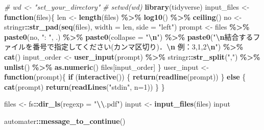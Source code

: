 \documentclass[
]{article}
\newenvironment{Shaded}{\begin{snugshade}}{\end{snugshade}}
\newcommand{\AttributeTok}[1]{\textcolor[rgb]{0.13,0.29,0.53}{#1}}
\newcommand{\CommentTok}[1]{\textcolor[rgb]{0.56,0.35,0.01}{\textit{#1}}}
\newcommand{\ControlFlowTok}[1]{\textcolor[rgb]{0.13,0.29,0.53}{\textbf{#1}}}
\newcommand{\DecValTok}[1]{\textcolor[rgb]{0.00,0.00,0.81}{#1}}
\newcommand{\FunctionTok}[1]{\textcolor[rgb]{0.13,0.29,0.53}{\textbf{#1}}}
\newcommand{\NormalTok}[1]{#1}
\newcommand{\OtherTok}[1]{\textcolor[rgb]{0.56,0.35,0.01}{#1}}
\newcommand{\SpecialCharTok}[1]{\textcolor[rgb]{0.81,0.36,0.00}{\textbf{#1}}}
\newcommand{\StringTok}[1]{\textcolor[rgb]{0.31,0.60,0.02}{#1}}
\begin{document}
\begin{Shaded}
\begin{Highlighting}[]
  \CommentTok{\# wd \textless{}{-} "set\_your\_directory"}
  \CommentTok{\# setwd(wd)}
\FunctionTok{library}\NormalTok{(tidyverse)}
\NormalTok{input\_files }\OtherTok{\textless{}{-}} \ControlFlowTok{function}\NormalTok{(files)\{}
\NormalTok{  len }\OtherTok{\textless{}{-}} \FunctionTok{length}\NormalTok{(files) }\SpecialCharTok{\%\textgreater{}\%} \FunctionTok{log10}\NormalTok{() }\SpecialCharTok{\%\textgreater{}\%} \FunctionTok{ceiling}\NormalTok{()}
\NormalTok{  no }\OtherTok{\textless{}{-}}\NormalTok{ stringr}\SpecialCharTok{::}\FunctionTok{str\_pad}\NormalTok{(}\FunctionTok{seq}\NormalTok{(files), }\AttributeTok{width =}\NormalTok{ len, }\AttributeTok{side =} \StringTok{"left"}\NormalTok{)}
\NormalTok{  prompt }\OtherTok{\textless{}{-}} 
\NormalTok{    files }\SpecialCharTok{\%\textgreater{}\%}
    \FunctionTok{paste0}\NormalTok{(no, }\StringTok{": "}\NormalTok{, .) }\SpecialCharTok{\%\textgreater{}\%}
    \FunctionTok{paste0}\NormalTok{(}\AttributeTok{collapse =} \StringTok{"}\SpecialCharTok{\textbackslash{}n}\StringTok{"}\NormalTok{) }\SpecialCharTok{\%\textgreater{}\%}
    \FunctionTok{paste0}\NormalTok{(}\StringTok{"}\SpecialCharTok{\textbackslash{}n}\StringTok{結合するファイルを番号で指定してください(カンマ区切り)．}\SpecialCharTok{\textbackslash{}n}\StringTok{  例：3,1,2}\SpecialCharTok{\textbackslash{}n}\StringTok{"}\NormalTok{) }\SpecialCharTok{\%\textgreater{}\%}
    \FunctionTok{cat}\NormalTok{()}
\NormalTok{  input\_order }\OtherTok{\textless{}{-}} 
    \FunctionTok{user\_input}\NormalTok{(prompt) }\SpecialCharTok{\%\textgreater{}\%}
\NormalTok{    stringr}\SpecialCharTok{::}\FunctionTok{str\_split}\NormalTok{(}\StringTok{","}\NormalTok{) }\SpecialCharTok{\%\textgreater{}\%}
    \FunctionTok{unlist}\NormalTok{() }\SpecialCharTok{\%\textgreater{}\%}
    \FunctionTok{as.numeric}\NormalTok{()}
\NormalTok{  files[input\_order]}
\NormalTok{\}}
\NormalTok{user\_input }\OtherTok{\textless{}{-}} \ControlFlowTok{function}\NormalTok{(prompt)\{}
  \ControlFlowTok{if}\NormalTok{ (}\FunctionTok{interactive}\NormalTok{()) \{}
    \FunctionTok{return}\NormalTok{(}\FunctionTok{readline}\NormalTok{(prompt))}
\NormalTok{  \} }\ControlFlowTok{else}\NormalTok{ \{}
    \FunctionTok{cat}\NormalTok{(prompt)}
    \FunctionTok{return}\NormalTok{(}\FunctionTok{readLines}\NormalTok{(}\StringTok{"stdin"}\NormalTok{, }\AttributeTok{n=}\DecValTok{1}\NormalTok{))}
\NormalTok{  \}}
\NormalTok{\}}

\NormalTok{files }\OtherTok{\textless{}{-}}\NormalTok{ fs}\SpecialCharTok{::}\FunctionTok{dir\_ls}\NormalTok{(}\AttributeTok{regexp =} \StringTok{"}\SpecialCharTok{\textbackslash{}\textbackslash{}}\StringTok{.pdf"}\NormalTok{)}
\NormalTok{input }\OtherTok{\textless{}{-}} \FunctionTok{input\_files}\NormalTok{(files)}
\NormalTok{input}

\NormalTok{automater}\SpecialCharTok{::}\FunctionTok{message\_to\_continue}\NormalTok{()}
\end{Highlighting}
\end{Shaded}
\end{document}
